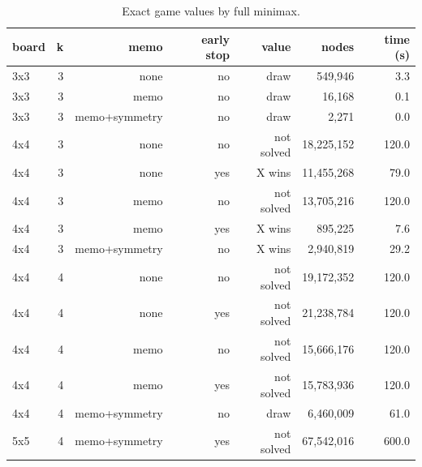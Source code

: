 \begin{table}[ht]
\centering
\begin{tabular}{lrrrrrr}
\toprule
board & k & memo & early stop & value & nodes & time (s) \\
\midrule
3x3 & 3 & none & no & draw & 549,946 & 3.3 \\
3x3 & 3 & memo & no & draw & 16,168 & 0.1 \\
3x3 & 3 & memo+symmetry & no & draw & 2,271 & 0.0 \\
4x4 & 3 & none & no & not solved & 18,225,152 & 120.0 \\
4x4 & 3 & none & yes & X wins & 11,455,268 & 79.0 \\
4x4 & 3 & memo & no & not solved & 13,705,216 & 120.0 \\
4x4 & 3 & memo & yes & X wins & 895,225 & 7.6 \\
4x4 & 3 & memo+symmetry & no & X wins & 2,940,819 & 29.2 \\
4x4 & 4 & none & no & not solved & 19,172,352 & 120.0 \\
4x4 & 4 & none & yes & not solved & 21,238,784 & 120.0 \\
4x4 & 4 & memo & no & not solved & 15,666,176 & 120.0 \\
4x4 & 4 & memo & yes & not solved & 15,783,936 & 120.0 \\
4x4 & 4 & memo+symmetry & no & draw & 6,460,009 & 61.0 \\
5x5 & 4 & memo+symmetry & yes & not solved & 67,542,016 & 600.0 \\
\bottomrule
\end{tabular}
\caption{Exact game values by full minimax.}
\label{tab:solve}
\end{table}
